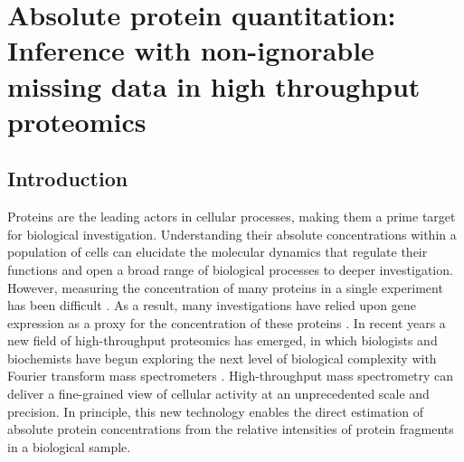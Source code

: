 

\chapter{Absolute protein quantitation: Inference with non-ignorable missing data in high throughput proteomics}
\label{proteomics:ch:proteomics}

\section{Introduction}
\label{proteomics:sec:intro}

Proteins are the leading actors in cellular processes, making them a prime target for biological investigation.
Understanding their absolute concentrations within a population of cells can elucidate the molecular dynamics that regulate their functions \citep{Ishihama:2005ir} and open a broad range of biological processes to deeper investigation.
However, measuring the concentration of many proteins in a single experiment has been difficult \citep{Ghaemmagham:2003tu}. 
As a result, many investigations have relied upon gene expression as a proxy for the concentration of these proteins \citep{Franks:2013}.
In recent years a new field of high-throughput proteomics has emerged, in which biologists and biochemists have begun exploring the next level of biological complexity with Fourier transform mass spectrometers  \citep{Scigelova:2006p10560,Scigelova:2011dt}.
High-throughput mass spectrometry can deliver a fine-grained view of cellular activity at an unprecedented scale and precision.
In principle, this new technology enables the direct estimation of absolute protein concentrations from the relative intensities of protein fragments in a biological sample.

